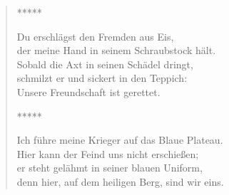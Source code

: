 \begin{verse}
*****

Du erschlägst den Fremden aus Eis,\\
der meine Hand in seinem Schraubstock hält.\\
Sobald die Axt in seinen Schädel dringt,\\
schmilzt er und sickert in den Teppich:\\
Unsere Freundschaft ist gerettet.

*****

Ich führe meine Krieger auf das Blaue Plateau.\\
Hier kann der Feind uns nicht erschießen;\\
er steht gelähmt in seiner blauen Uniform,\\
denn hier, auf dem heiligen Berg, sind wir eins.
\end{verse}

\cleartoverso


